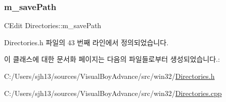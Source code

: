 \subsubsection{\texorpdfstring{m\+\_\+save\+Path}{m\_savePath}}
{\footnotesize\ttfamily C\+Edit Directories\+::m\+\_\+save\+Path}



Directories.\+h 파일의 43 번째 라인에서 정의되었습니다.



이 클래스에 대한 문서화 페이지는 다음의 파일들로부터 생성되었습니다.\+:\begin{DoxyCompactItemize}
\item 
C\+:/\+Users/sjh13/sources/\+Visual\+Boy\+Advance/src/win32/\mbox{\hyperlink{_directories_8h}{Directories.\+h}}\item 
C\+:/\+Users/sjh13/sources/\+Visual\+Boy\+Advance/src/win32/\mbox{\hyperlink{_directories_8cpp}{Directories.\+cpp}}\end{DoxyCompactItemize}
